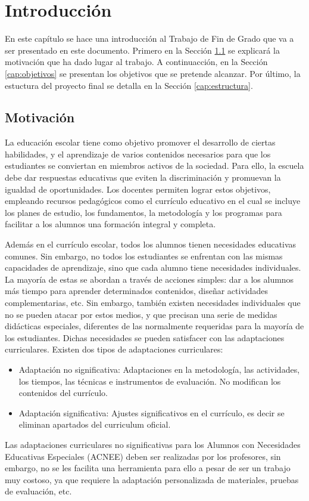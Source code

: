 \chapter{Introducción}
\label{ch:introduccion}

En este capítulo se hace una introducción al Trabajo de Fin de Grado que va a ser presentado en este documento. Primero en la Sección \ref{cap:motivacio} se explicará la motivación que ha dado lugar al trabajo. A continuacción, en la Sección \ref{cap:objetivos} se presentan los objetivos que se pretende alcanzar. Por último, la estuctura del proyecto final se detalla en la Sección \ref{cap:estructura}.

\section{Motivación}\label{cap:motivacio}
La educación escolar tiene como objetivo promover el desarrollo de ciertas habilidades, y el aprendizaje de varios contenidos necesarios para que los estudiantes se conviertan en miembros activos de la sociedad. Para ello, la escuela debe dar respuestas educativas que eviten la discriminación y promuevan la igualdad de oportunidades. Los docentes permiten lograr estos objetivos, empleando recursos pedagógicos como el currículo educativo en el cual se incluye los planes de estudio, los fundamentos, la metodología y los programas para facilitar a los alumnos una formación integral y completa.

Además en el currículo escolar, todos los alumnos tienen necesidades educativas comunes. Sin embargo, no todos los estudiantes se enfrentan con las mismas capacidades de aprendizaje, sino que cada alumno tiene necesidades individuales. La mayoría de estas se abordan a través de acciones simples: dar a los alumnos más tiempo para aprender determinados contenidos, diseñar actividades complementarias, etc.  Sin embargo, también existen necesidades individuales que no se pueden atacar por estos medios, y que precisan una serie de medidas didácticas especiales, diferentes de las normalmente requeridas para la mayoría de los estudiantes. Dichas necesidades se pueden satisfacer con las adaptaciones curriculares. Existen dos tipos de adaptaciones curriculares:
\begin{itemize}
    \item Adaptación no significativa: Adaptaciones en la metodología, las actividades, los tiempos,
    las técnicas e instrumentos de evaluación. No modifican los contenidos del currículo.  
    \item Adaptación significativa: Ajustes significativos en el currículo, es decir se eliminan apartados del curriculum oficial. 
\end{itemize}
Las adaptaciones curriculares no significativas para los Alumnos con Necesidades Educativas Especiales (ACNEE) deben ser realizadas por los profesores, sin embargo, no se les facilita una herramienta para ello a pesar de ser un trabajo muy costoso, ya que requiere la adaptación personalizada de materiales, pruebas de evaluación, etc.

